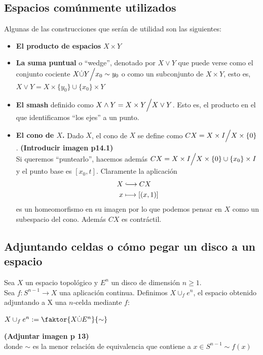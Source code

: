 \subsection{Espacios comúnmente utilizados}
Algunas de las construcciones que serán de utilidad son las siguientes:
\begin{itemize}
\item \textbf{El producto de espacios} $X \times Y$ \\

\item \textbf{La suma puntual} o ``wedge'', denotado por $X \vee Y$ que puede verse como el conjunto cociente $X \dot\cup Y \Bign/ x_0 \sim \nobreak y_0$ o como un subconjunto de  $X \times Y$, esto es, $X \vee Y = X \times \{y_0\} \cup \{x_0\} \times Y$\\

\item \textbf{El smash} definido como $X \wedge Y = X \times Y \Bign/ X \vee Y$. Esto es, el producto en el que identificamos ``los ejes'' a un punto.\\

\item \textbf{El cono de $X$.} Dado $X$, el cono de $X$ se define como $CX = X \times I \Bign/ X \times \{0\}$. \textbf{(Introducir imagen p14.1)}\\
Si queremos ``puntearlo'', hacemos además $CX = X \times I \Bign/ X \times \{ 0 \} \cup \{ x_0 \} \times I $ y el punto base es $[x_0, t]$. Claramente la aplicación 
\begin{align*}
X &\longhookrightarrow CX \\ 
x &\longmapsto [(x, 1)]
\end{align*}
es un homeomorfismo en su imagen por lo que podemos pensar en $X$ como un subespacio del cono. Además $CX$ es contráctil.
\end{itemize}
\subsection{Adjuntando celdas o cómo pegar un disco a un espacio}
Sea $X$ un espacio topológico y $E^n$ un disco de dimensión $n \geq 1$. \\
 Sea $f : S^{n-1} \longrightarrow X$ una aplicación continua. Definimos $X \cup_f e^n$, el espacio obtenido adjuntando a X una $n$-celda mediante $f$:
\begin{center}
$X \cup_f e^n := \faktor{ X \dot{\cup} E^n}{ \sim}$
\end{center}
\textbf{(Adjuntar imagen p 13)} \\
donde $\sim$ es la menor relación de equivalencia que contiene a $x \in S^{n-1} \sim f(x)$\\


